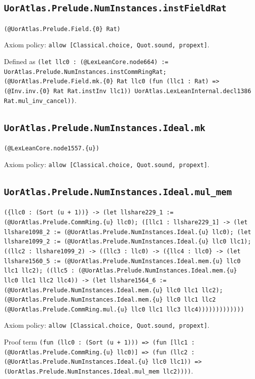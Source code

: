 \documentclass[11pt]{article}
\begin{document}
\subsection*{\texttt{UorAtlas.Prelude.NumInstances.instFieldRat}}
\noindent\texttt{(@UorAtlas.Prelude.Field.\{0\} Rat)}\par
\noindent Axiom policy: \texttt{allow [Classical.choice, Quot.sound, propext]}.\par
\noindent Defined as \texttt{(let llc0 : (@LexLeanCore.node664) := UorAtlas.Prelude.NumInstances.instCommRingRat; (@UorAtlas.Prelude.Field.mk.\{0\} Rat llc0 (fun (llc1 : Rat) => (@Inv.inv.\{0\} Rat Rat.instInv llc1)) UorAtlas.LexLeanInternal.decl1386 Rat.mul\_inv\_cancel))}.\par
\subsection*{\texttt{UorAtlas.Prelude.NumInstances.Ideal.mk}}
\noindent\texttt{(@LexLeanCore.node1557.\{u\})}\par
\noindent Axiom policy: \texttt{allow [Classical.choice, Quot.sound, propext]}.\par
\subsection*{\texttt{UorAtlas.Prelude.NumInstances.Ideal.mul\_mem}}
\noindent\texttt{(\{llc0 : (Sort (u + 1))\} -> (let llshare229\_1 := (@UorAtlas.Prelude.CommRing.\{u\} llc0); ([llc1 : llshare229\_1] -> (let llshare1098\_2 := (@UorAtlas.Prelude.NumInstances.Ideal.\{u\} llc0); (let llshare1099\_2 := (@UorAtlas.Prelude.NumInstances.Ideal.\{u\} llc0 llc1); ((llc2 : llshare1099\_2) -> ((llc3 : llc0) -> (\{llc4 : llc0\} -> (let llshare1560\_5 := (@UorAtlas.Prelude.NumInstances.Ideal.mem.\{u\} llc0 llc1 llc2); ((llc5 : (@UorAtlas.Prelude.NumInstances.Ideal.mem.\{u\} llc0 llc1 llc2 llc4)) -> (let llshare1564\_6 := (@UorAtlas.Prelude.NumInstances.Ideal.mem.\{u\} llc0 llc1 llc2); (@UorAtlas.Prelude.NumInstances.Ideal.mem.\{u\} llc0 llc1 llc2 (@UorAtlas.Prelude.CommRing.mul.\{u\} llc0 llc1 llc3 llc4)))))))))))))}\par
\noindent Axiom policy: \texttt{allow [Classical.choice, Quot.sound, propext]}.\par
\noindent Proof term \texttt{(fun (llc0 : (Sort (u + 1))) => (fun [llc1 : (@UorAtlas.Prelude.CommRing.\{u\} llc0)] => (fun (llc2 : (@UorAtlas.Prelude.NumInstances.Ideal.\{u\} llc0 llc1)) => (UorAtlas.Prelude.NumInstances.Ideal.mul\_mem llc2))))}.\par
\end{document}
